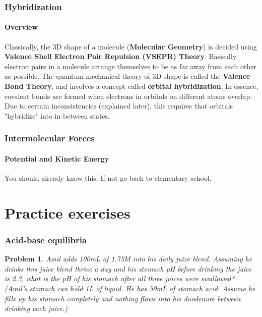 \documentclass[letterpaper, 12pt]{article}
\begin{document}
\clearpage

\section{Hybridization}

    \subsection{Overview}
    Classically, the 3D shape of a molecule (\textbf{Molecular Geometry}) is decided using \textbf{Valence Shell Electron Pair Repulsion (VSEPR) Theory}. Basically electron pairs in a molecule arrange themselves to be as far away from each other as possible. The quantum mechanical theory of 3D shape is called the \textbf{Valence Bond Theory}, and involves a concept called \textbf{orbital hybridization}. In essence, covalent bonds are formed when electrons in orbitals on different atoms overlap. Due to certain inconsistencies (explained later), this requires that orbitals "hybridize" into in-between states.

\clearpage

\section{Intermolecular Forces}

    \subsection{Potential and Kinetic Energy}
    You should already know this. If not go back to elementary school.

\clearpage

\setcounter{part}{999}
\setcounter{secnumdepth}{1}
\setcounter{section}{0}
\part{Practice exercises}

\newtheorem{problem}{Problem}[section]

\section{Acid-base equilibria}

\begin{problem}
Amil adds 100mL of 1.75M  into his daily juice blend. Assuming he drinks this juice blend thrice a day and his stomach pH before drinking the juice is 2.3, what is the pH of his stomach after all three juices were swallowed? (Amil's stomach can hold 1L of liquid. He has 50mL of stomach acid. Assume he fills up his stomach completely and nothing flows into his duodenum between drinking each juice.)
\end{problem}
\end{document}
